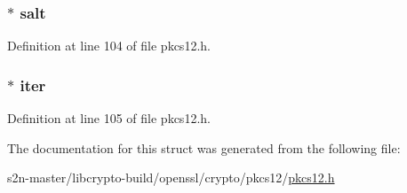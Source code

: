\subsubsection[{\texorpdfstring{salt}{salt}}]{ $\ast$ salt}\hypertarget{struct_p_k_c_s12___m_a_c___d_a_t_a_aaebd8a6f08ab440b05bacfa9bd8af07f}{}\label{struct_p_k_c_s12___m_a_c___d_a_t_a_aaebd8a6f08ab440b05bacfa9bd8af07f}


Definition at line 104 of file pkcs12.\+h.

\subsubsection[{\texorpdfstring{iter}{iter}}]{ $\ast$ iter}\hypertarget{struct_p_k_c_s12___m_a_c___d_a_t_a_ab7b90cf95e75c0cd6742cfe1aad7dd03}{}\label{struct_p_k_c_s12___m_a_c___d_a_t_a_ab7b90cf95e75c0cd6742cfe1aad7dd03}


Definition at line 105 of file pkcs12.\+h.



The documentation for this struct was generated from the following file\+:\begin{DoxyCompactItemize}
\item 
s2n-\/master/libcrypto-\/build/openssl/crypto/pkcs12/\hyperlink{crypto_2pkcs12_2pkcs12_8h}{pkcs12.\+h}\end{DoxyCompactItemize}
